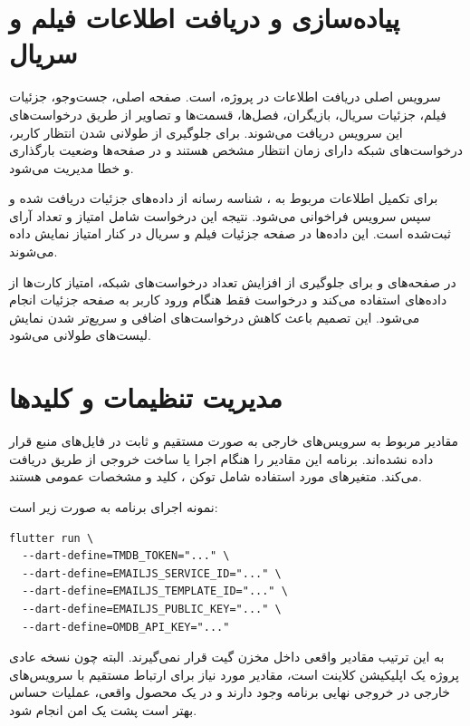\documentclass[a4paper,14pt]{extarticle}
\begin{document}
\section*{پیاده‌سازی  و دریافت اطلاعات فیلم و سریال}

سرویس اصلی دریافت اطلاعات در پروژه،  است. صفحه اصلی، جست‌وجو، جزئیات فیلم، جزئیات سریال، بازیگران، فصل‌ها، قسمت‌ها و تصاویر از طریق درخواست‌های این سرویس دریافت می‌شوند. برای جلوگیری از طولانی شدن انتظار کاربر، درخواست‌های شبکه دارای زمان انتظار مشخص هستند و در صفحه‌ها وضعیت بارگذاری و خطا مدیریت می‌شود.

برای تکمیل اطلاعات مربوط به ، شناسه  رسانه از داده‌های جزئیات دریافت شده و سپس سرویس  فراخوانی می‌شود. نتیجه این درخواست شامل امتیاز  و تعداد آرای ثبت‌شده است. این داده‌ها در صفحه جزئیات فیلم و سریال در کنار امتیاز  نمایش داده می‌شوند.

در صفحه‌های  و  برای جلوگیری از افزایش تعداد درخواست‌های شبکه، امتیاز کارت‌ها از داده‌های  استفاده می‌کند و درخواست  فقط هنگام ورود کاربر به صفحه جزئیات انجام می‌شود. این تصمیم باعث کاهش درخواست‌های اضافی و سریع‌تر شدن نمایش لیست‌های طولانی می‌شود.

\section*{مدیریت تنظیمات  و کلیدها}

مقادیر مربوط به سرویس‌های خارجی به صورت مستقیم و ثابت در فایل‌های منبع قرار داده نشده‌اند. برنامه این مقادیر را هنگام اجرا یا ساخت خروجی از طریق  دریافت می‌کند. متغیرهای مورد استفاده شامل توکن ، کلید  و مشخصات عمومی  هستند.

نمونه اجرای برنامه به صورت زیر است:

\begin{latin}
\begin{lstlisting}[style=nice]
flutter run \
  --dart-define=TMDB_TOKEN="..." \
  --dart-define=EMAILJS_SERVICE_ID="..." \
  --dart-define=EMAILJS_TEMPLATE_ID="..." \
  --dart-define=EMAILJS_PUBLIC_KEY="..." \
  --dart-define=OMDB_API_KEY="..."
\end{lstlisting}
\end{latin}

به این ترتیب مقادیر واقعی داخل مخزن گیت قرار نمی‌گیرند. البته چون نسخه عادی پروژه یک اپلیکیشن کلاینت است، مقادیر مورد نیاز برای ارتباط مستقیم با سرویس‌های خارجی در خروجی نهایی برنامه وجود دارند و در یک محصول واقعی، عملیات حساس بهتر است پشت یک  امن انجام شود.
\end{document}
